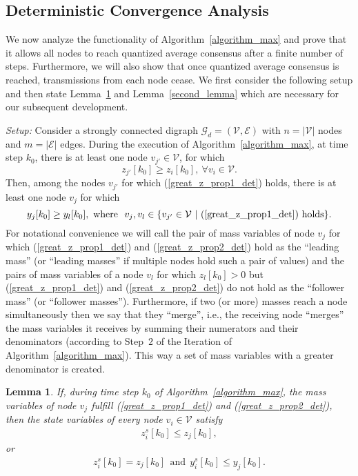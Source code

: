 \documentclass[twocolumn]{autart}    %
\newtheorem{lemma}{\bfseries Lemma}
\begin{document}
\subsection{Deterministic Convergence Analysis}\label{sec:Conv_analysis}

We now analyze the functionality of Algorithm~\ref{algorithm_max} and prove that it allows all nodes to reach quantized average consensus after a finite number of steps. 
Furthermore, we will also show that once quantized average consensus is reached, transmissions from each node cease. 
We first consider the following setup and then state Lemma~\ref{before_second_lemma} and Lemma~\ref{second_lemma} which are necessary for our subsequent development. 


{\it Setup:} Consider a strongly connected digraph $\mathcal{G}_d = (\mathcal{V}, \mathcal{E})$ with $n=|\mathcal{V}|$ nodes and $m=|\mathcal{E}|$ edges. 
During the execution of Algorithm~\ref{algorithm_max}, at time step $k_0$, there is at least one node $v_{j'} \in \mathcal{V}$, for which 
\begin{equation}\label{great_z_prop1_det}
z_{j'}[k_0] \geq z_i[k_0], \ \forall v_i \in \mathcal{V}.
\end{equation}
Then, among the nodes $v_{j'}$ for which (\ref{great_z_prop1_det}) holds, there is at least one node $v_j$ for which 
\begin{equation}\label{great_z_prop2_det}
y_j[k_0] \geq y_{l}[k_0] , \ \text{where} \ \ v_j, v_{l} \in \{ v_{j'} \in \mathcal{V} \ | \ (\ref{great_z_prop1_det}) \ \text{holds} \}.
\end{equation}
For notational convenience we will call the pair of mass variables of node $v_j$ for which (\ref{great_z_prop1_det}) and (\ref{great_z_prop2_det}) hold as the ``leading mass'' (or ``leading masses'' if multiple nodes hold such a pair of values) and the pairs of mass variables of a node $v_l$ for which $z_l[k_0]>0$ but (\ref{great_z_prop1_det}) and (\ref{great_z_prop2_det}) do not hold as the ``follower mass'' (or ``follower masses'').
Furthermore, if two (or more) masses reach a node simultaneously then we say that they ``merge'', i.e., the receiving node ``merges'' the mass variables it receives by summing their numerators and their denominators (according to Step~$2$ of the Iteration of Algorithm~\ref{algorithm_max}). 
This way a set of mass variables with a greater denominator is created.


\begin{lemma}\label{before_second_lemma}
If, during time step $k_0$ of Algorithm~\ref{algorithm_max}, the mass variables of node $v_j$ fulfill (\ref{great_z_prop1_det}) and (\ref{great_z_prop2_det}), then the state variables of every node $v_i \in \mathcal{V}$ satisfy 
\begin{eqnarray}\label{first_z}
z_i^s[k_0] \leq z_j[k_0] ,
\end{eqnarray}
or 
\begin{eqnarray}\label{first_zy}
z_i^s[k_0] = z_j[k_0] \ \ \text{and} \ \ y_i^s[k_0] \leq y_j[k_0].
\end{eqnarray}
\end{lemma}
\end{document}
